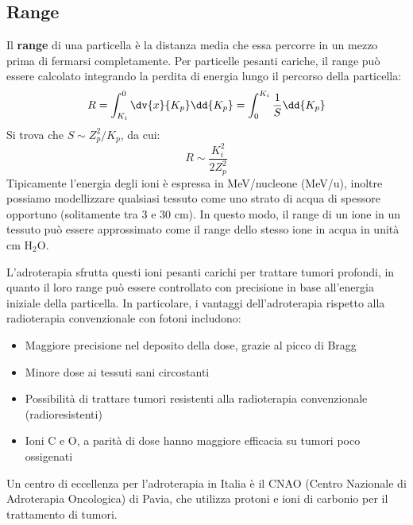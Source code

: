 \subsection{Range}
Il \textbf{range} di una particella è la distanza media che essa percorre in un mezzo prima di fermarsi completamente. Per particelle pesanti cariche, il range può essere calcolato integrando la perdita di energia lungo il percorso della particella:
\begin{equation}
    R = \int_{K_i}^{0} \dv{x}{K_p}\dd{K_p} = \int_{0}^{K_i} \dfrac{1}{S}\dd{K_p}
\end{equation}
Si trova che $S \sim Z_p^2/K_p$, da cui:
\begin{equation}
    R \sim \dfrac{K_i^2}{2 Z_p^2}
\end{equation}
Tipicamente l'energia degli ioni è espressa in MeV/nucleone (MeV/u), inoltre possiamo modellizzare qualsiasi tessuto come uno strato di acqua di spessore opportuno (solitamente tra 3 e 30 cm). In questo modo, il range di un ione in un tessuto può essere approssimato come il range dello stesso ione in acqua in unità cm H$_2$O.


L'adroterapia sfrutta questi ioni pesanti carichi per trattare tumori profondi, in quanto il loro range può essere controllato con precisione in base all'energia iniziale della particella. In particolare, i vantaggi dell'adroterapia rispetto alla radioterapia convenzionale con fotoni includono:
\begin{itemize}
    \item Maggiore precisione nel deposito della dose, grazie al picco di Bragg
    \item Minore dose ai tessuti sani circostanti
    \item Possibilità di trattare tumori resistenti alla radioterapia convenzionale (radioresistenti)
    \item Ioni C e O, a parità di dose hanno maggiore efficacia su tumori poco ossigenati
\end{itemize}
Un centro di eccellenza per l'adroterapia in Italia è il CNAO (Centro Nazionale di Adroterapia Oncologica) di Pavia, che utilizza protoni e ioni di carbonio per il trattamento di tumori.

